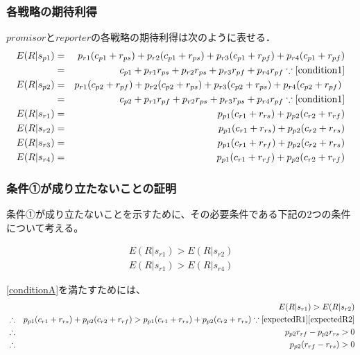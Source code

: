 \subsubsection{各戦略の期待利得}
$promisor$と$reporter$の各戦略の期待利得は次のように表せる．
\begin{eqnarray}
  E(R|s_{p1}) &=& p_{r1} (c_{p1} + r_{ps}) + p_{r2} (c_{p1} + r_{ps}) + p_{r3} (c_{p1} + r_{pf}) + p_{r4} (c_{p1} + r_{pf}) \nonumber \\
              &=& c_{p1} + p_{r1} r_{ps} + p_{r2} r_{ps} + p_{r3} r_{pf} + p_{r4} r_{pf} \because\eqref{condition1} \label{expectedA} \\
  E(R|s_{p2}) &=& p_{r1} (c_{p2} + r_{pf}) + p_{r2} (c_{p2} + r_{ps}) + p_{r3} (c_{p2} + r_{ps} ) + p_{r4} (c_{p2} + r_{pf}) \nonumber \\
              &=& c_{p2} + p_{r1} r_{pf} + p_{r2} r_{ps} + p_{r3} r_{ps} + p_{r4} r_{pf} \because\eqref{condition1} \label{expectedB} \\
  E(R|s_{r1}) &=& p_{p1} (c_{r1} + r_{rs}) + p_{p2} (c_{r2} + r_{rf}) \label{expectedR1} \\
  E(R|s_{r2}) &=& p_{p1} (c_{r1} + r_{rs}) + p_{p2} (c_{r2} + r_{rs}) \label{expectedR2} \\
  E(R|s_{r3}) &=& p_{p1} (c_{r1} + r_{rf}) + p_{p2} (c_{r2} + r_{rs}) \label{expectedR4} \nonumber \\
  E(R|s_{r4}) &=& p_{p1} (c_{r1} + r_{rf}) + p_{p2} (c_{r2} + r_{rf}) \label{expectedR3}
\end{eqnarray}

\subsubsection{条件①が成り立たないことの証明}

条件①が成り立たないことを示すために、その必要条件である下記の2つの条件について考える。

\begin{gather}
  E(R|s_{r1}) > E(R|s_{r2}) \label{conditionA} \\
  E(R|s_{r1}) > E(R|s_{r4}) \label{conditionB}
\end{gather}

\eqref{conditionA}を満たすためには、
\begin{eqnarray*}
  &&E(R|s_{r1}) > E(R|s_{r2}) \\
  &\therefore& p_{p1} (c_{r1} + r_{rs}) + p_{p2} (c_{r2} + r_{rf}) > p_{p1} (c_{r1} + r_{rs}) + p_{p2} (c_{r2} + r_{rs}) \because\eqref{expectedR1}\eqref{expectedR2}  \\
  &\therefore& p_{p2} r_{rf} - p_{p2} r_{rs} > 0 \\
  &\therefore& p_{p2} (r_{rf} - r_{rs}) > 0 \\
\end{eqnarray*}

